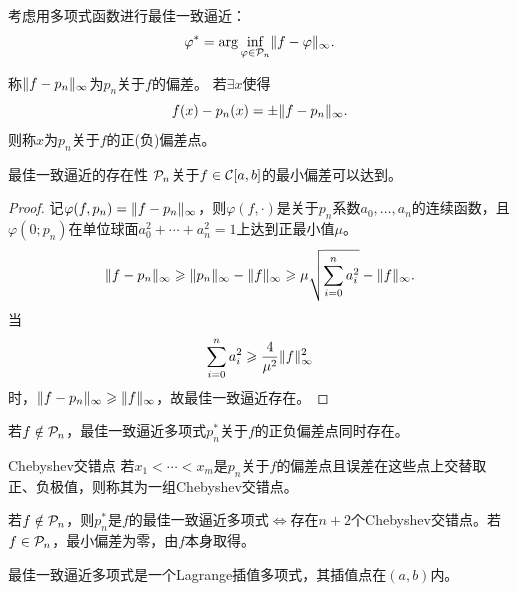 考虑用多项式函数进行最佳一致逼近：
\begin{equation}
    \varphi^* = \arg\inf_{\varphi\in\mathcal{P}_n}\lVert f - \varphi\rVert_\infty.
\end{equation}

\begin{definition}
    {}{}
    称$\lVert f - p_n\rVert_\infty$为$p_n$关于$f$的偏差。
    若$\exists x$使得
    \begin{equation}
        f(x) - p_n(x) = \pm\lVert f - p_n\rVert_\infty.
    \end{equation}
    则称$x$为$p_n$关于$f$的正(负)偏差点。
\end{definition}

\begin{theorem}
    {最佳一致逼近的存在性}{}
    $\mathcal{P}_n$关于$f \in \mathcal{C}[a,b]$的最小偏差可以达到。
\end{theorem}

\begin{proof}
    记$\varphi(f,p_n) = \lVert f - p_n\rVert_\infty$，则$\varphi(f, \cdot)$是关于$p_n$系数$a_0,\ldots,a_n$的连续函数，且$\varphi(0;p_n)$在单位球面$a_0^2 + \cdots + a_n^2 = 1$上达到正最小值$\mu$。
    \[
        \lVert f - p_n\rVert_\infty \geqslant \lVert p_n\rVert_\infty - \lVert f\rVert_\infty \geqslant \mu\sqrt{\sum_{i=0}^na_i^2} - \lVert f\rVert_\infty.
    \]
    当
    \[
        \sum_{i=0}^na_i^2 \geqslant \frac4{\mu^2}\lVert f\rVert_\infty^2
    \]
    时，$\lVert f - p_n\rVert_\infty \geqslant \lVert f\rVert_\infty$，故最佳一致逼近存在。
\end{proof}

\begin{lemma}
    若$f \notin \mathcal{P}_n$，最佳一致逼近多项式$p_n^*$关于$f$的正负偏差点同时存在。
\end{lemma}

\begin{definition}
    {Chebyshev交错点}{}
    若$x_1 < \cdots < x_m$是$p_n$关于$f$的偏差点且误差在这些点上交替取正、负极值，则称其为一组Chebyshev交错点。
\end{definition}

\begin{theorem}
    {}{}
    若$f \notin \mathcal{P}_n$，则$p_n^*$是$f$的最佳一致逼近多项式$\iff$存在$n + 2$个Chebyshev交错点。若$f \in \mathcal{P}_n$，最小偏差为零，由$f$本身取得。
\end{theorem}

\begin{corollary}
    最佳一致逼近多项式是一个Lagrange插值多项式，其插值点在$(a,b)$内。
\end{corollary}

